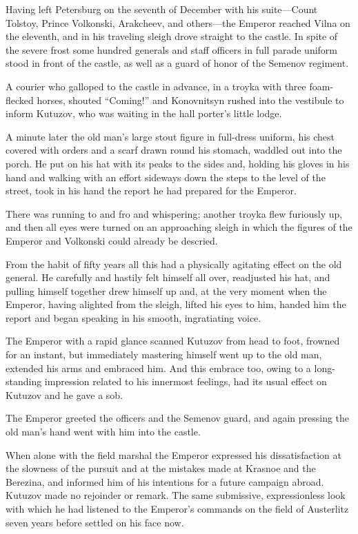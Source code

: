 Having left Petersburg on the seventh of December with his
suite---Count Tolstoy, Prince Volkonski, Arakcheev, and
others---the Emperor reached Vilna on the eleventh, and in his
traveling sleigh drove straight to the castle. In spite of the
severe frost some hundred generals and staff officers in full
parade uniform stood in front of the castle, as well as a guard
of honor of the Semenov regiment.

A courier who galloped to the castle in advance, in a troyka with
three foam-flecked horses, shouted ``Coming!'' and Konovnitsyn
rushed into the vestibule to inform Kutuzov, who was waiting in
the hall porter's little lodge.

A minute later the old man's large stout figure in full-dress
uniform, his chest covered with orders and a scarf drawn round
his stomach, waddled out into the porch. He put on his hat with
its peaks to the sides and, holding his gloves in his hand and
walking with an effort sideways down the steps to the level of
the street, took in his hand the report he had prepared for the
Emperor.

There was running to and fro and whispering; another troyka flew
furiously up, and then all eyes were turned on an approaching
sleigh in which the figures of the Emperor and Volkonski could
already be descried.

From the habit of fifty years all this had a physically agitating
effect on the old general. He carefully and hastily felt himself
all over, readjusted his hat, and pulling himself together drew
himself up and, at the very moment when the Emperor, having
alighted from the sleigh, lifted his eyes to him, handed him the
report and began speaking in his smooth, ingratiating voice.

The Emperor with a rapid glance scanned Kutuzov from head to
foot, frowned for an instant, but immediately mastering himself
went up to the old man, extended his arms and embraced him. And
this embrace too, owing to a long-standing impression related to
his innermost feelings, had its usual effect on Kutuzov and he
gave a sob.

The Emperor greeted the officers and the Semenov guard, and again
pressing the old man's hand went with him into the castle.

When alone with the field marshal the Emperor expressed his
dissatisfaction at the slowness of the pursuit and at the
mistakes made at Krasnoe and the Berezina, and informed him of
his intentions for a future campaign abroad. Kutuzov made no
rejoinder or remark. The same submissive, expressionless look
with which he had listened to the Emperor's commands on the field
of Austerlitz seven years before settled on his face now.

